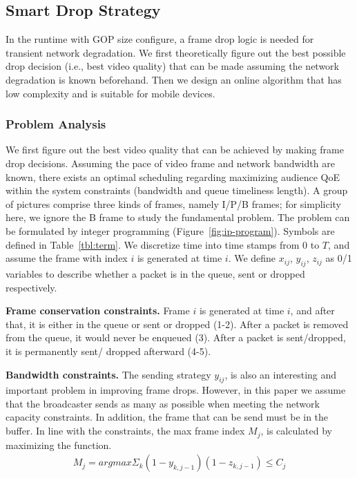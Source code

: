 \vspace{-0.05in}
\subsection{Smart Drop Strategy}
\label{subsec:drop-strategy}
In the runtime with GOP size configure, a frame drop logic is needed for transient network degradation. We first theoretically figure out the best possible drop decision (i.e., best video quality) that can be made assuming the network degradation is known beforehand. Then we design an online algorithm that has low complexity and is suitable for mobile devices.

\subsubsection{Problem Analysis}


We first figure out the best video quality that can be achieved by making frame drop decisions.
Assuming the pace of video frame and network bandwidth are known, there exists an optimal scheduling regarding maximizing audience QoE within the system constraints (bandwidth and queue timeliness length). A group of pictures comprise three kinds of frames, namely I/P/B frames; for simplicity here, we ignore the B frame to study the fundamental problem. The problem can be formulated by integer programming (Figure~\ref{fig:ip-program}). Symbols are defined in Table~\ref{tbl:term}. We discretize time into time stamps from $0$ to $T$, and assume the frame with index $i$ is generated at time $i$. We define $x_{ij}$, $y_{ij}$, $z_{ij}$ as 0/1 variables to describe whether a packet is in the queue, sent or dropped respectively.

\textbf{Frame conservation constraints.}
Frame $i$ is generated at time $i$, and after that, it is either in the queue or sent or dropped (1-2).
After a packet is removed from the queue, it would never be enqueued (3).
After a packet is sent/dropped, it is permanently sent/ dropped afterward (4-5).

\textbf{Bandwidth constraints.}
The sending strategy $y_{ij}$, is also an interesting and important problem in improving frame drops. However, in this paper we assume that the broadcaster sends as many as possible when meeting the network capacity constraints. In addition, the frame that can be send must be in the buffer. In line with the constraints, the max frame index $M_{j}$, is calculated by maximizing the function.
\vspace{-0.1in}
\begin{align}
M_j = argmax \Sigma_k (1-y_{k,j-1})(1-z_{k,j-1}) \leq C_{j}
\end{align}

